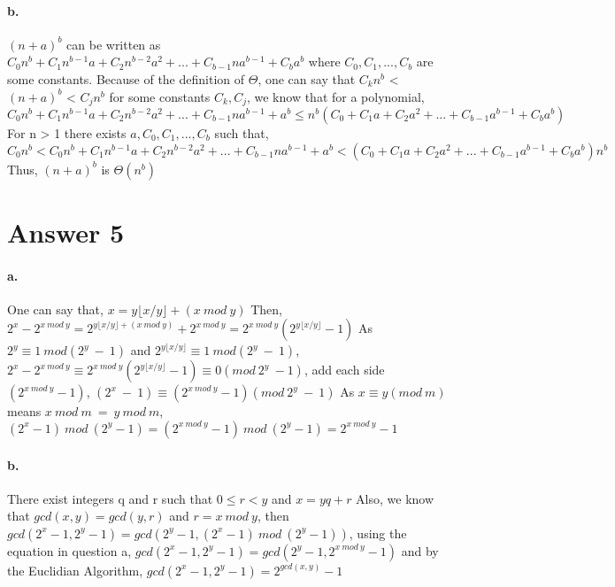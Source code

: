 \documentclass[11pt]{article}
\begin{document}
\paragraph{b.} $(n+a)^b$ can be written as $C_0n^b + C_1n^{b-1}a + C_2n^{b-2}a^2 + ... + C_{b-1}na^{b-1} + C_ba^b$ where $C_0, C_1,..., C_b$ are some constants.\newline
Because of the definition of $\Theta$, one can say that \newline
$C_kn^b$ < $(n+a)^b$ < $C_jn^b$ for some constants $C_k, C_j$, we know that for a polynomial,\newline
$C_0n^b + C_1n^{b-1}a + C_2n^{b-2}a^2 + ... + C_{b-1}na^{b-1} + a^b \leq n^b(C_0 + C_1a + C_2a^2 +...+ C_{b-1}a^{b-1} + C_ba^b)$\newline
For n > 1 there exists $a, C_0, C_1,..., C_b$ such that, \newline
$C_0n^b < C_0n^b + C_1n^{b-1}a + C_2n^{b-2}a^2 + ... + C_{b-1}na^{b-1} + a^b < (C_0 + C_1a + C_2a^2 +...+ C_{b-1}a^{b-1} + C_ba^b)n^b$\newline
Thus, $(n+a)^b$ is $\Theta(n^b)$
\section*{Answer 5}
\paragraph{a.} One can say that, $x = y{\lfloor x/y \rfloor} + (x\:mod\:y)$ Then, \newline \newline
$2^x - 2^{x\:mod\:y} = 2^{y{\lfloor x/y \rfloor} + (x\:mod\:y)} + 2^{x\:mod\:y} = 2^{x\:mod\:y}(2^{y{\lfloor x/y \rfloor}} - 1)$\newline
As $2^y \equiv 1\:mod(2^y\:-\:1)$ and $2^{y{\lfloor x/y \rfloor}} \equiv 1\:mod(2^y\:-\:1)$,\newline
$2^x - 2^{x\:mod\:y} \equiv 2^{x\:mod\:y}(2^{y{\lfloor x/y \rfloor}} - 1) \equiv 0(mod\:2^y\:-1)$, add each side $(2^{x\:mod\:y} -1)$,\newline
$(2^x\:-\:1) \equiv (2^{x\:mod\:y} -1)(mod\:2^y\:-\:1)$ \newline
As $x \equiv y(mod\:m)$ means $x\:mod\:m\:=\:y\:mod\:m$,\newline
$(2^x - 1)\:mod\:(2^y - 1) = (2^{x\:mod\:y} - 1)\:mod\:(2^y - 1) = 2^{x\:mod\:y} - 1$
\paragraph{b.} There exist integers q and r such that $0\leq r < y$ and $x = yq + r$\newline
Also, we know that $gcd(x,y) = gcd(y,r)$ and $r = x\:mod\:y$, then\newline
$gcd(2^x-1, 2^y-1) = gcd(2^y - 1,(2^x -1)\:mod\:(2^y - 1))$, using the equation in question a,\newline
$gcd(2^x - 1,2^y - 1) = gcd(2^y - 1, 2^{x\:mod\:y} - 1)$ and by the Euclidian Algorithm,\newline
$gcd(2^x - 1,2^y - 1) = 2^{gcd(x,y)} - 1$
\end{document}
